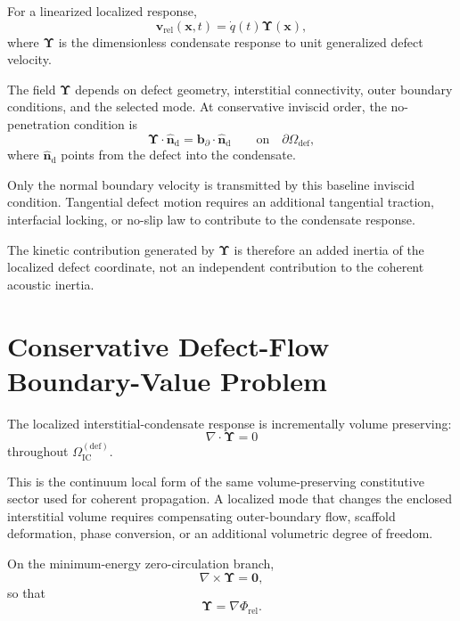 For a linearized localized response,
\begin{equation}
    \mathbf{v}_{\mathrm{rel}}(\mathbf{x},t)
    =
    \dot{q}(t)
    \boldsymbol{\Upsilon}(\mathbf{x}),
\end{equation}
where $\boldsymbol{\Upsilon}$ is the dimensionless condensate response to unit generalized defect velocity.

The field $\boldsymbol{\Upsilon}$ depends on defect geometry, interstitial connectivity, outer boundary conditions, and the selected mode. At conservative inviscid order, the no-penetration condition is
\begin{equation}
    \boldsymbol{\Upsilon}
    \cdot
    \hat{\mathbf{n}}_{\mathrm{d}}
    =
    \mathbf{b}_{\partial}
    \cdot
    \hat{\mathbf{n}}_{\mathrm{d}}
    \qquad
    \mathrm{on}
    \quad
    \partial\Omega_{\mathrm{def}},
\end{equation}
where $\hat{\mathbf{n}}_{\mathrm{d}}$ points from the defect into the condensate.

Only the normal boundary velocity is transmitted by this baseline inviscid condition. Tangential defect motion requires an additional tangential traction, interfacial locking, or no-slip law to contribute to the condensate response.

The kinetic contribution generated by $\boldsymbol{\Upsilon}$ is therefore an added inertia of the localized defect coordinate, not an independent contribution to the coherent acoustic inertia.


\section[Defect-Flow Boundary-Value Problem]{Conservative Defect-Flow Boundary-Value Problem}
\label{sec:AP_defect_boundary_value_problem}

The localized interstitial-condensate response is incrementally volume preserving:
\begin{equation}
    \nabla\cdot\boldsymbol{\Upsilon}
    =
    0
\end{equation}
throughout $\Omega_{\mathrm{IC}}^{(\mathrm{def})}$.

This is the continuum local form of the same volume-preserving constitutive sector used for coherent propagation. A localized mode that changes the enclosed interstitial volume requires compensating outer-boundary flow, scaffold deformation, phase conversion, or an additional volumetric degree of freedom.

On the minimum-energy zero-circulation branch,
\begin{equation}
    \nabla\times\boldsymbol{\Upsilon}
    =
    \mathbf{0},
\end{equation}
so that
\begin{equation}
    \boldsymbol{\Upsilon}
    =
    \nabla\Phi_{\mathrm{rel}}.
\end{equation}

